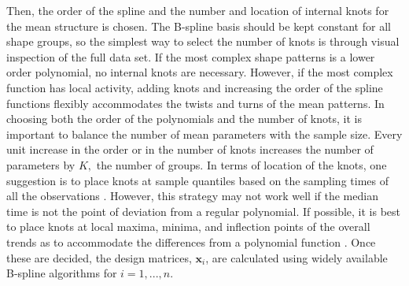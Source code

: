 \documentclass[12pt]{article}
\newcommand{\B}[0]{\mathbf}
\begin{document}
Then, the order of the spline and the number and location of internal knots for the mean structure is chosen. The B-spline basis should be kept constant for all shape groups, so the simplest way to select the number of knots is through visual inspection of the full data set. If the most complex shape patterns is a lower order polynomial, no internal knots are necessary. However, if the most complex function has local activity, adding knots and increasing the order of the spline functions flexibly accommodates the twists and turns of the mean patterns. In choosing both the order of the polynomials and the number of knots, it is important to balance the number of mean parameters with the sample size. Every unit increase in the order or in the number of knots increases the number of parameters by $K,$ the number of groups. In terms of location of the knots, one suggestion is to place knots at sample quantiles based on the sampling times of all the observations \cite{ruppert2002}. However, this strategy may not work well if the median time is not the point of deviation from a regular polynomial. If possible, it is best to place knots at local maxima, minima, and inflection points of the overall trends as to accommodate the differences from a polynomial function \cite{eubank1999}.  Once these are decided, the design matrices, $\B x_{i}$, are calculated using widely available B-spline algorithms for $i=1,...,n$. 
\end{document}

